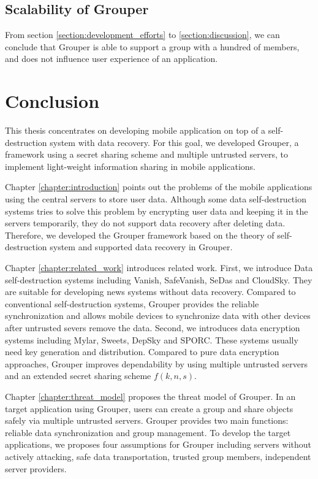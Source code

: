 \documentclass[a4paper,11pt]{report}
\begin{document}
\section{Scalability of Grouper} \label{section:grouper_scalability}

From section \ref{section:development_efforts} to \ref{section:discussion}, we can conclude that Grouper is able to support a group with a hundred of members, and does not influence user experience of an application.

\chapter{Conclusion} \label{chapter:conclusion}

This thesis concentrates on developing mobile application on top of a self-destruction system with data recovery.
For this goal, we developed Grouper, a framework using a secret sharing scheme and multiple untrusted servers, to implement light-weight information sharing in mobile applications.

Chapter \ref{chapter:introduction} points out the problems of the mobile applications using the central servers to store user data.
Although some data self-destruction systems tries to solve this problem by encrypting user data and keeping it in the servers temporarily, they do not support data recovery after deleting data.
Therefore, we developed the Grouper framework based on the theory of self-destruction system and supported data recovery in Grouper.

Chapter \ref{chapter:related_work} introduces related work.
First, we introduce Data self-destruction systems including Vanish, SafeVanish, SeDas and CloudSky.
They are suitable for developing news systems without data recovery.
Compared to conventional self-destruction systems, Grouper provides the reliable synchronization and allows mobile devices to synchronize data with other devices after untrusted severs remove the data.
Second, we introduces data encryption systems including Mylar, Sweets, DepSky and SPORC.
These systems usually need key generation and distribution.
Compared to pure data encryption approaches, Grouper improves dependability by using multiple untrusted servers and an extended secret sharing scheme $f(k, n, s)$.

Chapter \ref{chapter:threat_model} proposes the threat model of Grouper.
In an target application using Grouper, users can create a group and share objects safely via multiple untrusted servers.
Grouper provides two main functions: reliable data synchronization and group management.
To develop the target applications, we proposes four assumptions for Grouper including servers without actively attacking, safe data transportation, trusted group members, independent server providers.
\end{document}
